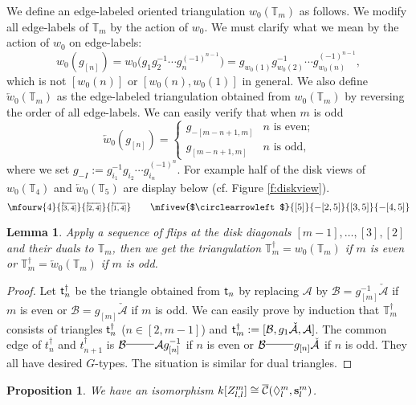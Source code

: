 \documentclass{amsart}
\newtheorem{lemma}[theorem]{Lemma}
\newtheorem{proposition}[theorem]{Proposition}
\theoremstyle{definition}
\theoremstyle{remark}
\numberwithin{equation}{section}
\newcommand{\mc}[1]{\mathcal{#1}}
\newcommand{\mb}[1]{\mathbb{#1}}
\newcommand{\mch}[1]{\check{\mathcal{#1}}}
\renewcommand{\b}[1]{\bold{#1}}
\newcommand{\br}[1]{\overline{#1}}
\renewcommand{\t}{{\sf t}}
\newcommand{\uca}{\br{\mc{C}}}
\newcommand{\zllm}{{Z_{l,l}^m}}
\newcommand{\invarr}[1]{{\scriptsize \overleftarrow{#1}}}
\begin{document}
We define an edge-labeled oriented triangulation $w_0(\mb{T}_m)$ as follows.
We modify all edge-labels of $\mb{T}_m$ by the action of $w_0$.
We must clarify what we mean by the action of $w_0$ on edge-labels:
$$w_0(g_{[n]}) = w_0\big(g_1g_2^{-1}\cdots g_n^{(-1)^{n-1}}\big)= g_{w_0(1)}g_{w_0(2)}^{-1}\cdots g_{w_0(n)}^{(-1)^{n-1}},$$
which is not $[w_0(n)]$ or $[w_0(n),w_0(1)]$ in general.
We also define $\overleftarrow{w}_0(\mb{T}_m)$ as the edge-labeled triangulation obtained from ${w}_0(\mb{T}_m)$ by reversing the order of all edge-labels.
We can easily verify that when $m$ is odd
$$\overleftarrow{w}_0(g_{[n]})=\begin{cases}g_{-[m-n+1,m]} & n \text{ is even;}\\ g_{[m-n+1,m]} & n \text{ is odd,} \end{cases}$$
where we set $g_{-I}:=g_{i_1}^{-1}g_{i_2}\cdots g_{i_n}^{(-1)^{n}}$.
For example half of the disk views of $w_0(\mb{T}_4)$ and $\overleftarrow{w}_0(\mb{T}_5)$ are display below (cf. Figure \ref{f:diskview}).
$$\mfourw{4}{\invarr{[3,4]}}{\invarr{[2,4]}}{\invarr{[1,4]}} \qquad \mfivew{$\circlearrowleft$}{[5]}{-[2,5]}{{[3,5]}}{-[4,5]}$$
 

\begin{lemma} \label{L:Tmflip} Apply a sequence of flips at the disk diagonals $[m-1],\dots,[3],[2]$ and their duals to $\mb{T}_m$, then we get the triangulation $\mb{T}_m^\dagger={w}_0(\mb{T}_m)$ if $m$ is even or $\mb{T}_m^\dagger=\overleftarrow{w}_0(\mb{T}_m)$ if $m$ is odd.
\end{lemma}

\begin{proof} 
	Let $\t_n^\dagger$ be the triangle obtained from $\t_n$ by replacing $\mc{A}$ by $\mc{B}=g_{[m]}^{-1}\mch{A}$ if $m$ is even or $\mc{B}=g_{[m]}\mch{A}$ if $m$ is odd.
	We can easily prove by induction that $\mb{T}_m^\dagger$ consists of triangles $\t_n^\dagger$ ($n\in[2,m-1]$) and 
	$\t_{m}^\dagger:=[\mc{B},g_1\mch{A},\mc{A}]$.
	The common edge of $t_{n}^\dagger$ and $t_{n+1}^\dagger$ is $\mc{B}^{\line(1,0){25}}\mc{A}g_{[n]}^{-1}$ if $n$ is even 
	or $\mc{B}^{\line(1,0){25}}g_{[n]}\mch{A}$ if $n$ is odd.
	They all have desired $G$-types. The situation is similar for dual triangles.
\end{proof}


\begin{proposition} \label{P:Zllmcluster} 
We have an isomorphism $k[\zllm]\cong \uca(\Diamond_l^m,\b{s}_l^m)$.
\end{proposition}
\end{document}

